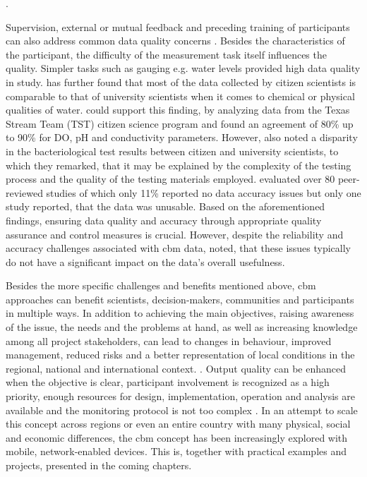 \autocite{fraislCitizenScienceEnvironmental2022,lackstromBackyardHydroclimatologyCitizen2022}.

Supervision, external or mutual feedback and preceding training of participants can also address common data quality concerns \autocite{albusAccuracyLongtermVolunteer2020,baalbakiCitizenScienceLebanon2019,fraislCitizenScienceEnvironmental2022}. Besides the characteristics of the participant, the difficulty of the measurement task itself influences the quality. Simpler tasks such as gauging e.g. water levels provided high data quality in \autocite{weeserCitizenSciencePioneers2018a} study. \autocite{baalbakiCitizenScienceLebanon2019} has further found that most of the data collected by citizen scientists is comparable to that of university scientists when it comes to chemical or physical qualities of water. \autocite{albusAccuracyLongtermVolunteer2020} could support this finding, by analyzing data from the Texas Stream Team (TST) citizen science program and found an agreement of 80\% up to 90\% for DO, pH and conductivity parameters. However, \autocite{baalbakiCitizenScienceLebanon2019} also noted a disparity in the bacteriological test results between citizen and university scientists, to which they remarked, that it may be explained by the complexity of the testing process and the quality of the testing materials employed. \autocite{aceves-buenoCitizenScienceApproach2015} evaluated over 80 peer-reviewed studies of which only 11\% reported no data accuracy issues but only one study reported, that the data was unusable. Based on the aforementioned findings, ensuring data quality and accuracy through appropriate quality assurance and control measures is crucial. However, despite the reliability and accuracy challenges associated with \acrshort*{cbm} data, \autocite{aceves-buenoCitizenScienceApproach2015} noted, that these issues typically do not have a significant impact on the data's overall usefulness.

Besides the more specific challenges and benefits mentioned above, \acrlong*{cbm} approaches can benefit scientists, decision-makers, communities and participants in multiple ways. In addition to achieving the main objectives, raising awareness of the issue, the needs and the problems at hand, as well as increasing knowledge among all project stakeholders, can lead to changes in behaviour, improved management, reduced risks and a better representation of local conditions in the regional, national and international context. \autocite{huangManagementDrinkingWater2020,walkerBenefitsNegativeImpacts2021}. Output quality can be enhanced when the objective is clear, participant involvement is recognized as a high priority, enough resources for design, implementation, operation and analysis are available and the monitoring protocol is not too complex \autocite{butteFrameworkWaterSecurity2022, pocockStrategicFrameworkSupport}. 
In an attempt to scale this concept across regions or even an entire country with many physical, social and economic differences, the \acrshort*{cbm} concept has been increasingly explored with mobile, network-enabled devices. This is, together with practical examples and projects, presented in the coming chapters.


